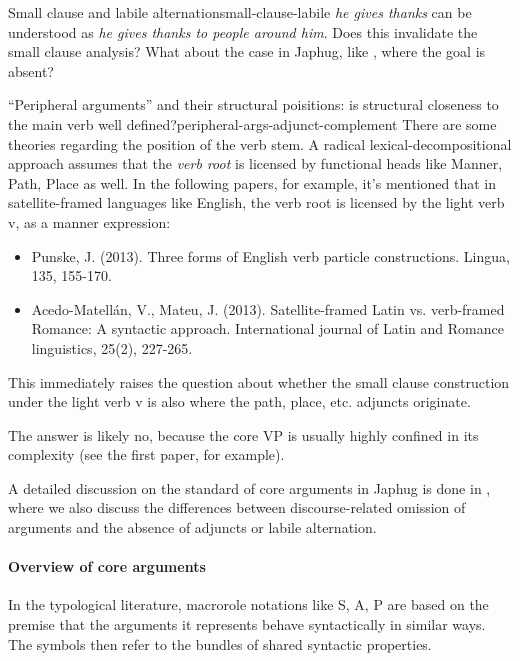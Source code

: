 \documentclass[a4paper, oneside, 12pt]{report}
\newcommand*{\citesec}[1]{\S~{#1}}
\newcommand{\form}[1]{\emph{#1}}
\begin{document}
\begin{todobox}{Small clause and labile alternation}{small-clause-labile}
    \form{he gives thanks} can be understood as
    \form{he gives thanks to people around him}.
    Does this invalidate the small clause analysis?
    What about the case in Japhug,
    like \citep[\citesec{22.1.2.2}, (29)]{jacques2021grammar},
    where the goal is absent?
\end{todobox}

\begin{todobox}{``Peripheral arguments'' and their structural poisitions: is structural closeness to the main verb well defined?}{peripheral-args-adjunct-complement}
    There are some theories regarding the position of the verb stem.
    A radical lexical-decompositional approach assumes that 
    the \emph{verb root} is licensed by functional heads like Manner, Path, Place as well.
    In the following papers, for example,
    it's mentioned that in satellite-framed languages like English,
    the verb root is licensed by the light verb v,
    as a manner expression:
    \begin{itemize}
        \item Punske, J. (2013). Three forms of English verb particle constructions. Lingua, 135, 155-170.
        \item Acedo-Matellán, V.,  Mateu, J. (2013). Satellite-framed Latin vs. verb-framed Romance: A syntactic approach. International journal of Latin and Romance linguistics, 25(2), 227-265.
    \end{itemize}
    This immediately raises the question about whether 
    the small clause construction under the light verb v 
    is also where the path, place, etc. adjuncts originate.

    The answer is likely no, because the core VP is usually highly confined in its complexity 
    (see the first paper, for example).

\end{todobox}

A detailed discussion on the standard of core arguments in Japhug
is done in ,
where we also discuss the differences between discourse-related omission of arguments
and the absence of adjuncts or labile alternation.


\paragraph*{Overview of core arguments}
In the typological literature, macrorole notations like S, A, P 
are based on the premise that the arguments it represents
behave syntactically in similar ways.
The symbols then refer to the bundles of shared syntactic properties.
\end{document}

